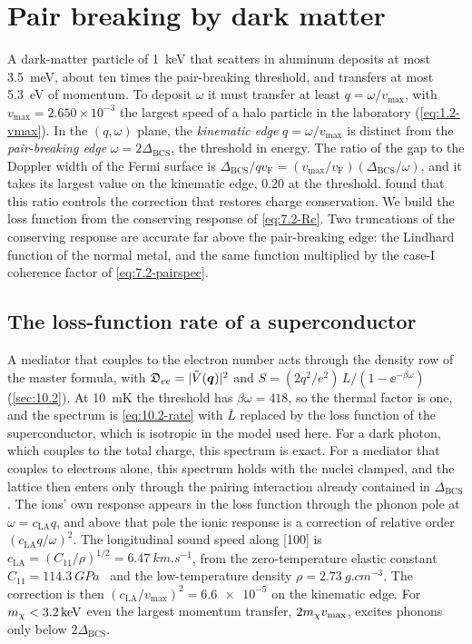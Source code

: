 \section{Pair breaking by dark matter}\label{sec:15.1}

A dark-matter particle of \SI{1}{keV} that scatters in aluminum deposits at most \SI{3.5}{meV}, about ten times the pair-breaking threshold, and transfers at most \SI{5.3}{eV} of momentum. To deposit $\omega$ it must transfer at least $q = \omega/v_{\mathrm{max}}$, with $v_{\mathrm{max}} = 2.650\times10^{-3}$ the largest speed of a halo particle in the laboratory (\cref{eq:1.2-vmax}). In the $(q,\omega)$ plane, the \emph{kinematic edge} $q = \omega/v_{\mathrm{max}}$ is distinct from the \emph{pair-breaking edge} $\omega = 2\Delta_{\mathrm{BCS}}$, the threshold in energy. The ratio of the gap to the Doppler width of the Fermi surface is $\Delta_{\mathrm{BCS}}/qv_{\mathrm{F}} = (v_{\mathrm{max}}/v_{\mathrm{F}})(\Delta_{\mathrm{BCS}}/\omega)$, and it takes its largest value on the kinematic edge, 0.20 at the threshold.  found that this ratio controls the correction that restores charge conservation. We build the loss function from the conserving response of \cref{eq:7.2-Rc}. Two truncations of the conserving response are accurate far above the pair-breaking edge: the Lindhard function of the normal metal, and the same function multiplied by the case-I coherence factor of \cref{eq:7.2-pairspec}.

\subsection{The loss-function rate of a superconductor}\label{sec:15.1-rate}

A mediator that couples to the electron number acts through the density row of the master formula, with $\mathfrak{D}_{ee} = |\tilde V(\bm{q})|^2$ and $S = (2q^2/e^2)\,L/(1 - \ee^{-\beta\omega})$ (\cref{sec:10.2}). At \SI{10}{mK} the threshold has $\beta\omega = 418$, so the thermal factor is one, and the spectrum is \cref{eq:10.2-rate} with $\bar L$ replaced by the loss function of the superconductor, which is isotropic in the model used here. For a dark photon, which couples to the total charge, this spectrum is exact. For a mediator that couples to electrons alone, this spectrum holds with the nuclei clamped, and the lattice then enters only through the pairing interaction already contained in $\Delta_{\mathrm{BCS}}$. The ions' own response appears in the loss function through the phonon pole at $\omega = c_{\mathrm{LA}}q$, and above that pole the ionic response is a correction of relative order $(c_{\mathrm{LA}}q/\omega)^2$. The longitudinal sound speed along [100] is $c_{\mathrm{LA}} = (C_{11}/\rho)^{1/2} = \SI{6.47}{km.s^{-1}}$, from the zero-temperature elastic constant $C_{11} = \SI{114.3}{GPa}$~\cite[Table~2]{malica2020quasi} and the low-temperature density $\rho = \SI{2.73}{g.cm^{-3}}$. The correction is then $(c_{\mathrm{LA}}/v_{\mathrm{max}})^2 = \num{6.6e-5}$ on the kinematic edge. For $m_{\chi} < \SI{3.2}{keV}$ even the largest momentum transfer, $2m_{\chi} v_{\mathrm{max}}$, excites phonons only below $2\Delta_{\mathrm{BCS}}$.

